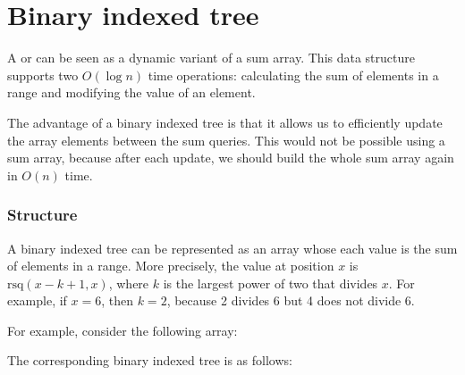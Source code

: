 \section{Binary indexed tree}


A  or 
can be seen as a dynamic variant of a sum array.
This data structure supports two $O(\log n)$ time operations:
calculating the sum of elements in a range
and modifying the value of an element.

The advantage of a binary indexed tree is
that it allows us to efficiently update
the array elements between the sum queries.
This would not be possible using a sum array,
because after each update, we should build the
whole sum array again in $O(n)$ time.

\subsubsection{Structure}

A binary indexed tree can be represented as an array
whose each value is the sum of elements in a range.
More precisely, the value at position $x$ 
is $\textrm{rsq}(x-k+1,x)$,
where $k$ is the largest power of two that divides $x$.
For example, if $x=6$, then $k=2$, because 2 divides 6
but 4 does not divide 6.

\begin{samepage}
For example, consider the following array:
\begin{center}
\end{center}
\end{samepage}
\begin{samepage}
The corresponding binary indexed tree is as follows:
\begin{center}
\end{center}
\end{samepage}

